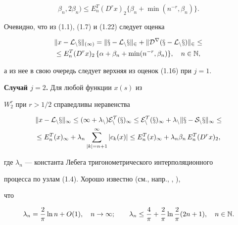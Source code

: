 \begin{pf}
\begin{equation}
\beta_n,2\beta_n)\le


E_n^T(D^rx)_2\bigl\{ \beta_n +\min (n^{-r},\beta_n)\bigr\} .


\end{equation}


Очевидно, что из (1.1), (1.7) и (1.22) следует оценка


\begin{gather}


\|x-\cal{L}_nx\|_{(1)}=


\|x-\cal{L}_nx\|_2+ \|D^r(x-\cal{L}_nx)\|_2 \le\notag\\


%


\le E_n^T(D^rx)_2\, \{ \alpha + \beta_n + \min (n^{-r},\beta_n)\},\quad


n\in \Bbb{N},


\end{gather}


а из нее в свою очередь следует верхняя из оценок (1.16) при $j=1$.





{\bf Случай $j=2$.} Для любой функции $x(s)$ из


$W_2^r$ при $r>1/2$ справедливы неравенства


\begin{gather}


\|x-\cal {L}_nx\|_\infty \le (1+\lambda_n)E_n^T(x)_\infty \le


E_n^T(x)_\infty +\lambda_n\|x-S_nx\|_\infty \le\notag\\


%


\le E_n^T(x)_\infty +\lambda_n\sum_{|k|=n+1}^\infty |c_k(x)|\le


E_n^T(x)_\infty +\lambda_n\beta_n\, E_n^T(D^rx)_2,


\end{gather}


где $\lambda_n $ --- константа Лебега тригонометрического интерполяционного


процесса по узлам (1.4). Хорошо известно (см., напр., \cite{Nik}, \cite{Tur1}),


что


\begin{equation}


\lambda_n=\frac{2}{\pi}\ln n +O(1), \quad n\to \infty ;\qquad


\lambda_n \le \frac{4}{\pi} +\frac{2}{\pi}


\ln {\frac{2}{\pi}(2n+1)} ,\quad n\in \Bbb{N}.



\end{equation}
\end{pf}
